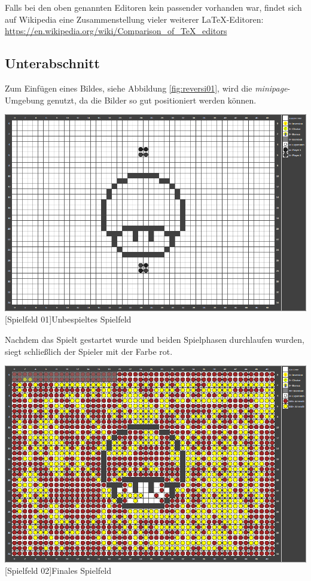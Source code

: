 \documentclass[12pt,a4paper]{article}
\begin{document}
Falls bei den oben genannten Editoren kein passender vorhanden war, findet sich auf Wikipedia eine Zusammenstellung vieler weiterer \LaTeX-Editoren:\\[1em]
\hspace*{3cm}\url{https://en.wikipedia.org/wiki/Comparison_of_TeX_editors}


\subsection{Unterabschnitt}
Zum Einfügen eines Bildes, siehe Abbildung \ref{fig:reversi01}, wird die \textit{minipage}-Umgebung genutzt, da die Bilder so gut positioniert werden können.

\vspace{1em}
\begin{minipage}{\linewidth}
	\centering
	\includegraphics[width=0.6\linewidth]{pics/gamefield01.png}
	[Spielfeld 01]{Unbespieltes Spielfeld\footnotemark }
	\label{fig:reversi01}
\end{minipage}

Nachdem das Spielt gestartet wurde und beiden Spielphasen durchlaufen wurden, siegt schließlich der Spieler mit der Farbe rot.

\vspace{1em}
\begin{minipage}{\linewidth}
	\centering
	\includegraphics[width=0.6\linewidth]{pics/gamefield02.png}
	[Spielfeld 02]{Finales Spielfeld\footnotemark }
	\label{fig:reversi2}
\end{minipage}
\end{document}
